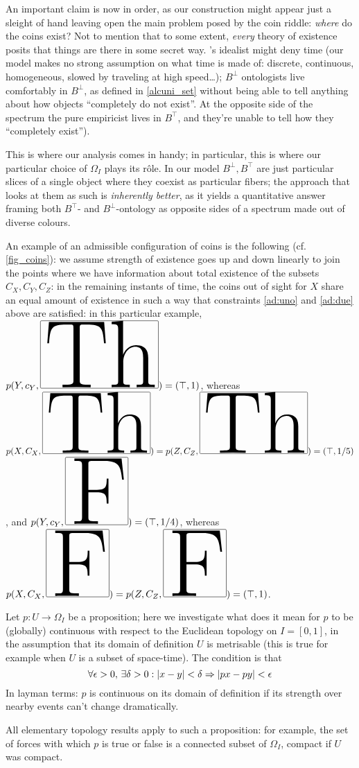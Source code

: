 \begin{remark}
  An important claim is now in order, as our construction might appear just a sleight of hand leaving open the main problem posed by the coin riddle: \emph{where} do the coins exist? Not to mention that to some extent, \emph{every} theory of existence posits that things are there in some secret way. \tlon's idealist might deny time (our model makes no strong assumption on what time is made of: discrete, continuous, homogeneous, slowed by traveling at high speed\dots); $B^\bot$ ontologists live comfortably in $B^\bot$, as defined in \autoref{alcuni_set} without being able to tell anything about how objects ``completely do not exist''.
  At the opposite side of the spectrum the pure empiricist lives in $B^\top$, and they're unable to tell how they ``completely exist'').

  This is where our analysis comes in handy; in particular, this is where our particular choice of $\Omega_I$ plays its r\^ole. In our model $B^\perp, B^\top$ are just particular slices of a single object where they coexist as particular fibers; the approach that looks at them as such is \emph{inherently better}, as it yields a quantitative answer framing both $B^\top$- and $B^\bot$-ontology as opposite sides of a spectrum made out of diverse colours.
\end{remark}
\begin{example}
  An example of an admissible configuration of coins is the following (cf. \autoref{fig_coins}): we assume strength of existence goes up and down linearly to join the points where we have information about total existence of the subsets $C_X,C_Y,C_Z$: in the remaining instants of time, the coins out of sight for $X$ share an equal amount of existence in such a way that constraints \ref{ad:uno} and \ref{ad:due} above are satisfied: in this particular example, $p(Y,c_Y,\Th) = (\top,1)$, whereas $p(X,C_X,\Th)=p(Z,C_Z,\Th)=(\top,1/5)$, and $p(Y,c_Y,\F)=(\top,1/4)$, whereas $p(X,C_X,\F)=p(Z,C_Z,\F)=(\top,1)$.
\end{example}
\begin{remark}\label{continuiti}
  Let $p : U \to \Omega_I$ be a proposition; here we investigate what does it mean for $p$ to be (globally) continuous with respect to the Euclidean topology on $I=[0,1]$, in the assumption that its domain of definition $U$ is metrisable (this is true for example when $U$ is a subset of space-time). The condition is that
  \[ \forall \epsilon > 0,\,\exists \delta > 0 : |x-y|< \delta \Rightarrow |px-py| < \epsilon \]
  In layman terms: $p$ is continuous on its domain of definition if its strength over nearby events can't change dramatically.

  All elementary topology results apply to such a proposition: for example, the set of forces with which $p$ is true or false is a connected subset of $\Omega_I$, compact if $U$ was compact.
\end{remark}
